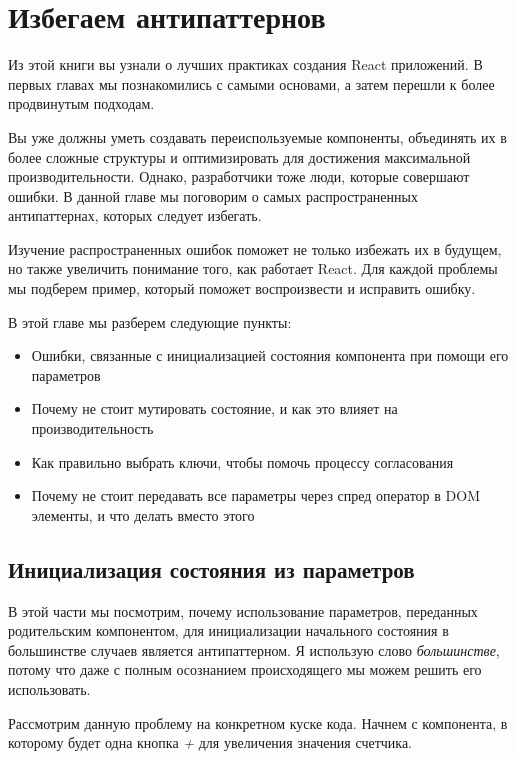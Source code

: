 \chapter{Избегаем антипаттернов}

Из этой книги вы узнали о лучших практиках создания React приложений. В первых главах мы познакомились с самыми основами, а затем перешли к более продвинутым подходам.

Вы уже должны уметь создавать переиспользуемые компоненты, объединять их в более сложные структуры и оптимизировать для достижения максимальной производительности. Однако, разработчики тоже люди, которые совершают ошибки. В данной главе мы поговорим о самых распространенных антипаттернах, которых следует избегать.

Изучение распространенных ошибок поможет не только избежать их в будущем, но также увеличить понимание того, как работает React. Для каждой проблемы мы подберем пример, который поможет воспроизвести и исправить ошибку.

В этой главе мы разберем следующие пункты:

\begin{itemize}
  \item Ошибки, связанные с инициализацией состояния компонента при помощи его параметров
  \item Почему не стоит мутировать состояние, и как это влияет на производительность
  \item Как правильно выбрать ключи, чтобы помочь процессу согласования
  \item Почему не стоит передавать все параметры через спред оператор в DOM элементы, и что делать вместо этого
\end{itemize}


\section{Инициализация состояния из параметров}

В этой части мы посмотрим, почему использование параметров, переданных родительским компонентом, для инициализации начального состояния в большинстве случаев является антипаттерном. Я использую слово \textit{большинстве}, потому что даже с полным осознанием происходящего мы можем решить его использовать.

Рассмотрим данную проблему на конкретном куске кода. Начнем с компонента, в которому будет одна кнопка \textit{+} для увеличения значения счетчика.


